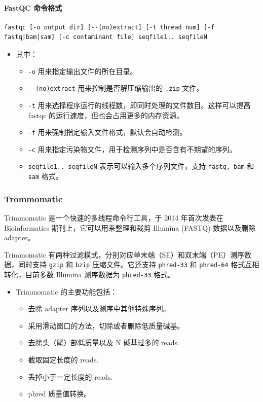 \documentclass[UTF8]{ctexart}
\begin{document}
\paragraph*{FastQC 命令格式}

\begin{lstlisting}
fastqc [-o output dir] [--(no)extract] [-t thread num] [-f fastq|bam|sam] [-c contaminant file] seqfile1.. seqfileN
\end{lstlisting}

\begin{itemize}
	\item 其中：
	\begin{itemize}
		\item \verb|-o| 用来指定输出文件的所在目录。
		\item \verb|--(no)extract| 用来控制是否解压缩输出的 \verb|.zip| 文件。
		\item \verb|-t| 用来选择程序运行的线程数，即同时处理的文件数目。这样可以提高 fastqc 的运行速度，但也会占用更多的内存资源。
		\item \verb|-f| 用来强制指定输入文件格式，默认会自动检测。
		\item \verb|-c| 用来指定污染物文件，用于检测序列中是否含有不期望的序列。
		\item \verb|seqfile1.. seqfileN| 表示可以输入多个序列文件，支持 \verb|fastq, bam| 和 \verb|sam| 格式。
	\end{itemize}
\end{itemize}

\subsubsection{Trommomatic}

Trimmomatic 是一个快速的多线程命令行工具，于 2014 年首次发表在 Bioinformatics 期刊上，它可以用来整理和裁剪 Illumina (FASTQ) 数据以及删除 adapter。

Trimmomatic 有两种过滤模式，分别对应单末端（SE）和双末端（PE）测序数据，同时支持 \verb|gzip| 和 \verb|bzip| 压缩文件。它还支持 \verb|phred-33| 和 \verb|phred-64| 格式互相转化，目前多数 Illumina 测序数据为 \verb|phred-33| 格式。

\begin{itemize}
	\item Trimmomatic 的主要功能包括：
	\begin{itemize}
		\item 去除 adapter 序列以及测序中其他特殊序列。
		\item 采用滑动窗口的方法，切除或者删除低质量碱基。
		\item 去除头（尾）部低质量以及 N 碱基过多的 reads.
		\item 截取固定长度的 reads.
		\item 丢掉小于一定长度的 reads.
		\item phred 质量值转换。
	\end{itemize}
\end{itemize}
\end{document}
